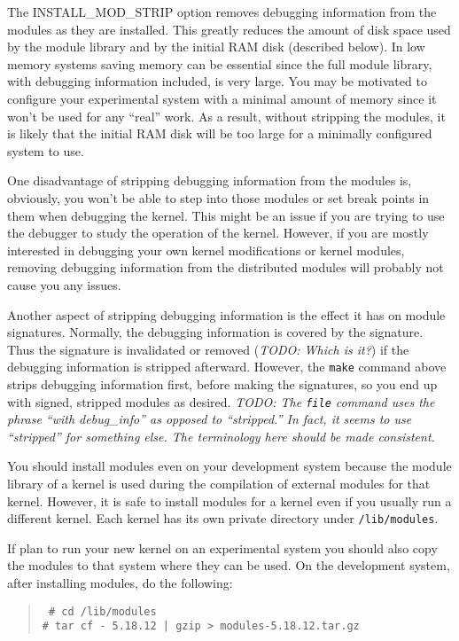 \documentclass{article}
\newcommand{\command}[1]{\texttt{#1}}
\newcommand{\filename}[1]{\texttt{#1}}
\newcommand{\todo}[1]{\textit{TODO: #1}}
\newenvironment{commands}
  {\begin{quote} \tt}
  {\end{quote}}
\begin{document}
The INSTALL\_MOD\_STRIP option removes debugging information from the modules as they are
installed. This greatly reduces the amount of disk space used by the module library and by the
initial RAM disk (described below). In low memory systems saving memory can be essential since
the full module library, with debugging information included, is very large. You may be
motivated to configure your experimental system with a minimal amount of memory since it won't
be used for any ``real'' work. As a result, without stripping the modules, it is likely that the
initial RAM disk will be too large for a minimally configured system to use.

One disadvantage of stripping debugging information from the modules is, obviously, you won't be
able to step into those modules or set break points in them when debugging the kernel. This
might be an issue if you are trying to use the debugger to study the operation of the kernel.
However, if you are mostly interested in debugging your own kernel modifications or kernel
modules, removing debugging information from the distributed modules will probably not cause you
any issues.

Another aspect of stripping debugging information is the effect it has on module signatures.
Normally, the debugging information is covered by the signature. Thus the signature is
invalidated or removed (\todo{Which is it?}) if the debugging information is stripped afterward.
However, the \command{make} command above strips debugging information first, before making the
signatures, so you end up with signed, stripped modules as desired. \todo{The \command{file}
  command uses the phrase ``with debug\_info'' as opposed to ``stripped.'' In fact, it seems to
  use ``stripped'' for something else. The terminology here should be made consistent.}

You should install modules even on your development system because the module library of a
kernel is used during the compilation of external modules for that kernel. However, it is safe
to install modules for a kernel even if you usually run a different kernel. Each kernel has its
own private directory under \filename{/lib/modules}.

If plan to run your new kernel on an experimental system you should also copy the modules to
that system where they can be used. On the development system, after installing modules, do the
following:
\begin{commands}
  \# cd /lib/modules \\
  \# tar cf - 5.18.12 | gzip > modules-5.18.12.tar.gz
\end{commands}
\end{document}
